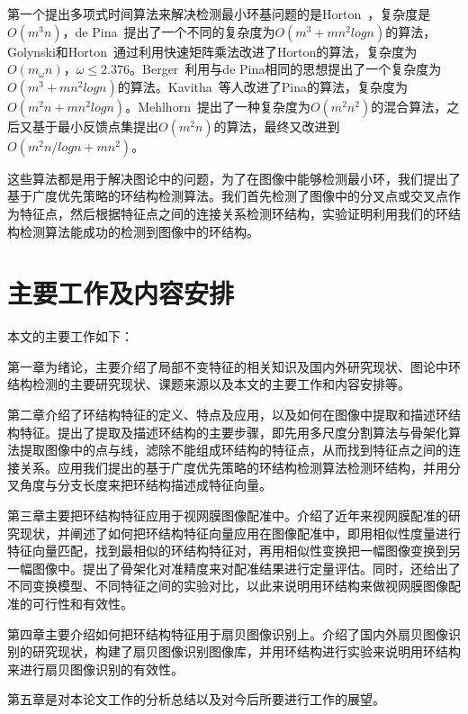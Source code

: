 第一个提出多项式时间算法来解决检测最小环基问题的是Horton~\cite{horton}，复杂度是$O(m^3n)$，de Pina~\cite{pina}提出了一个不同的复杂度为$O(m^3+mn^2logn)$的算法，Golynski和Horton~\cite{golynski}通过利用快速矩阵乘法改进了Horton的算法，复杂度为$O(m_{\omega}n)$，$\omega \le 2.376$。Berger~\cite{berger}利用与de Pina相同的思想提出了一个复杂度为$O(m^3+mn^2logn)$的算法。Kavitha~\cite{kavitha}等人改进了Pina的算法，复杂度为$O(m^2n+mn^2logn)$。Mehlhorn~\cite{mehlhorn}提出了一种复杂度为$O(m^2n^2)$的混合算法，之后又基于最小反馈点集提出$O(m^2n)$的算法，最终又改进到$O(m^2n/logn + mn^2)$。

这些算法都是用于解决图论中的问题，为了在图像中能够检测最小环，我们提出了基于广度优先策略的环结构检测算法。我们首先检测了图像中的分叉点或交叉点作为特征点，然后根据特征点之间的连接关系检测环结构，实验证明利用我们的环结构检测算法能成功的检测到图像中的环结构。




\section{主要工作及内容安排}
\label{sec:bib}

本文的主要工作如下：

第一章为绪论，主要介绍了局部不变特征的相关知识及国内外研究现状、图论中环结构检测的主要研究现状、课题来源以及本文的主要工作和内容安排等。

第二章介绍了环结构特征的定义、特点及应用，以及如何在图像中提取和描述环结构特征。提出了提取及描述环结构的主要步骤，即先用多尺度分割算法与骨架化算法提取图像中的点与线，滤除不能组成环结构的特征点，从而找到特征点之间的连接关系。应用我们提出的基于广度优先策略的环结构检测算法检测环结构，并用分叉角度与分支长度来把环结构描述成特征向量。

第三章主要把环结构特征应用于视网膜图像配准中。介绍了近年来视网膜配准的研究现状，并阐述了如何把环结构特征向量应用在图像配准中，即用相似性度量进行特征向量匹配，找到最相似的环结构特征对，再用相似性变换把一幅图像变换到另一幅图像中。提出了骨架化对准精度来对配准结果进行定量评估。同时，还给出了不同变换模型、不同特征之间的实验对比，以此来说明用环结构来做视网膜图像配准的可行性和有效性。

第四章主要介绍如何把环结构特征用于扇贝图像识别上。介绍了国内外扇贝图像识别的研究现状，构建了扇贝图像识别图像库，并用环结构进行实验来说明用环结构来进行扇贝图像识别的有效性。

第五章是对本论文工作的分析总结以及对今后所要进行工作的展望。
